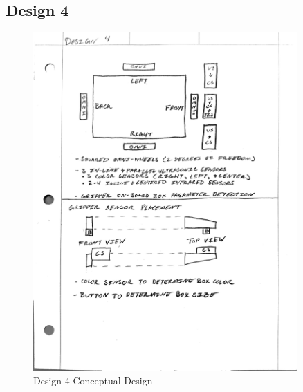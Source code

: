 \documentclass[12pt]{report}
\begin{document}
\subsection{Design 4}
\begin{figure}[H]
    \centering
    \includegraphics[width=0.9\textwidth]{Images/Designs/Design4.pdf}
    \caption{Design 4 Conceptual Design}
    \label{fig:design4}
\end{figure}
\end{document}
